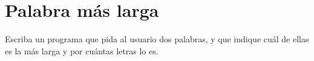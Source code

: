 \section{Palabra más larga}

Escriba un programa que pida al usuario dos palabras, y que indique cuál
de ellas es la más larga y por cuántas letras lo es.

